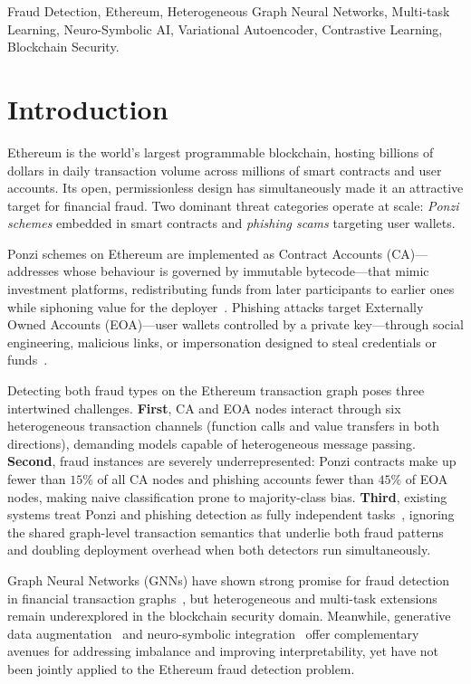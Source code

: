 \documentclass[conference]{IEEEtran}
\begin{document}
\begin{IEEEkeywords}
Fraud Detection, Ethereum, Heterogeneous Graph Neural Networks,
Multi-task Learning, Neuro-Symbolic AI, Variational Autoencoder,
Contrastive Learning, Blockchain Security.
\end{IEEEkeywords}

\section{Introduction}
\label{sec:intro}

Ethereum is the world's largest programmable blockchain, hosting
billions of dollars in daily transaction volume across millions of
smart contracts and user accounts.  Its open, permissionless design
has simultaneously made it an attractive target for financial fraud.
Two dominant threat categories operate at scale:
\textit{Ponzi schemes} embedded in smart contracts and
\textit{phishing scams} targeting user wallets.

Ponzi schemes on Ethereum are implemented as Contract Accounts
(CA)---addresses whose behaviour is governed by immutable
bytecode---that mimic investment platforms, redistributing funds from
later participants to earlier ones while siphoning value for the
deployer~\cite{chen2018detecting}.
Phishing attacks target Externally Owned Accounts (EOA)---user wallets
controlled by a private key---through social engineering, malicious
links, or impersonation designed to steal credentials or
funds~\cite{wu2020phishing}.

Detecting both fraud types on the Ethereum transaction graph poses three
intertwined challenges.
\textbf{First}, CA and EOA nodes interact through six heterogeneous
transaction channels (function calls and value transfers in both
directions), demanding models capable of heterogeneous message passing.
\textbf{Second}, fraud instances are severely underrepresented:
Ponzi contracts make up fewer than $15\%$ of all CA nodes and phishing
accounts fewer than $45\%$ of EOA nodes, making naive classification
prone to majority-class bias.
\textbf{Third}, existing systems treat Ponzi and phishing detection as
fully independent tasks~\cite{chen2021smartcontract,wu2020phishing},
ignoring the shared graph-level transaction semantics that underlie
both fraud patterns and doubling deployment overhead when both
detectors run simultaneously.

Graph Neural Networks (GNNs) have shown strong promise for fraud
detection in financial transaction graphs~\cite{liu2021fraud}, but
heterogeneous and multi-task extensions remain underexplored in the
blockchain security domain.  Meanwhile, generative data
augmentation~\cite{zhao2021graphsmote} and neuro-symbolic
integration~\cite{garcez2022neurosymbolic} offer complementary
avenues for addressing imbalance and improving interpretability, yet
have not been jointly applied to the Ethereum fraud detection problem.
\end{document}
